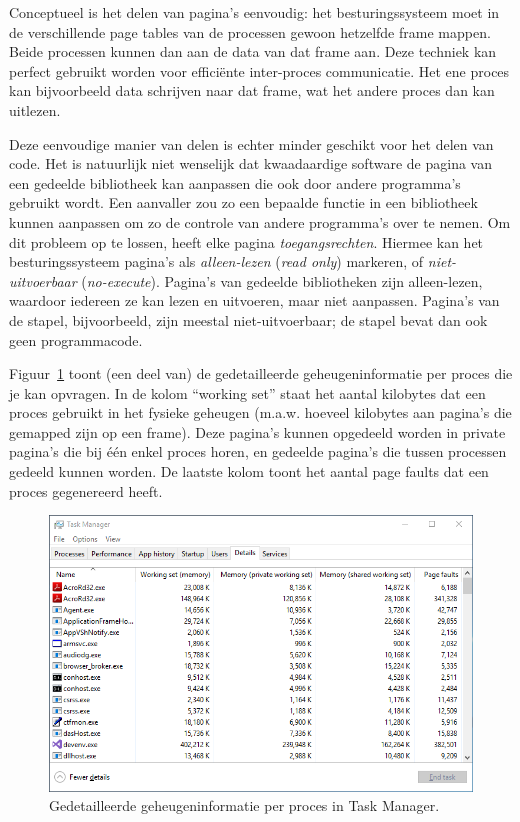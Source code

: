 Conceptueel is het delen van pagina's eenvoudig: het besturingssysteem moet in de verschillende page tables van de processen gewoon hetzelfde frame mappen. Beide processen kunnen dan aan de data van dat frame aan. Deze techniek kan perfect gebruikt worden voor effici\"ente inter-proces communicatie. Het ene proces kan bijvoorbeeld data schrijven naar dat frame, wat het andere proces dan kan uitlezen.

Deze eenvoudige manier van delen is echter minder geschikt voor het delen van code. Het is natuurlijk niet wenselijk dat kwaadaardige software de pagina van een gedeelde bibliotheek kan aanpassen die ook door andere programma's gebruikt wordt. Een aanvaller zou zo een bepaalde functie in een bibliotheek kunnen aanpassen om zo de controle van andere programma's over te nemen. Om dit probleem op te lossen, heeft elke pagina \emph{toegangsrechten}. Hiermee kan het besturingssysteem pagina's als \emph{alleen-lezen} (\emph{read only}) markeren, of \emph{niet-uitvoerbaar} (\emph{no-execute}). Pagina's van gedeelde bibliotheken zijn alleen-lezen, waardoor iedereen ze kan lezen en uitvoeren, maar niet aanpassen. Pagina's van de stapel, bijvoorbeeld, zijn meestal niet-uitvoerbaar; de stapel bevat dan ook geen programmacode.

Figuur~\ref{taskmgr_memdet} toont (een deel van) de gedetailleerde geheugeninformatie per proces die je kan opvragen. In de kolom ``working set'' staat het aantal kilobytes dat een proces gebruikt in het fysieke geheugen (m.a.w. hoeveel kilobytes aan pagina's die gemapped zijn op een frame). Deze pagina's kunnen opgedeeld worden in private pagina's die bij \'e\'en enkel proces horen, en gedeelde pagina's die tussen processen gedeeld kunnen worden. De laatste kolom toont het aantal page faults dat een proces gegenereerd heeft.

\begin{figure}
\begin{center}
\includegraphics[width=1.0\textwidth]{images/taskmgr_memdet.png}
\end{center}
\caption{Gedetailleerde geheugeninformatie per proces in Task Manager.}
\label{taskmgr_memdet}
\end{figure}

